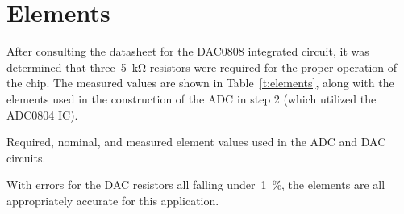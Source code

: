 \section{Elements}

After consulting the datasheet for the DAC0808 integrated circuit, it was
determined that three~\SI{5}{\kilo\ohm} resistors were required for the proper
operation of the chip.  The measured values are shown in
Table~\ref{t:elements}, along with the elements used in the construction of the
ADC in step 2 (which utilized the ADC0804 IC).
%
\begin{table}[H]
\centering
	
	\parbox{.8\textwidth}{
	\caption[List of used elements]{Required, nominal, and measured element
	values used in the ADC and DAC circuits.}
	\label{t:elements}}
\end{table}
%
With errors for the DAC resistors all falling under~\SI{1}{\percent}, the
elements are all appropriately accurate for this application.
